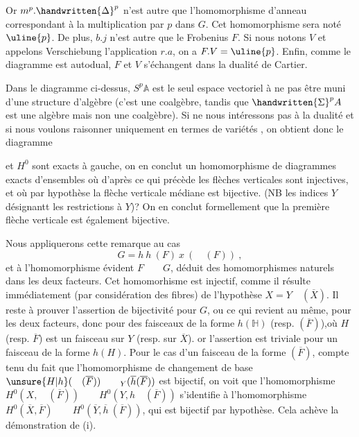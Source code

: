 Or $m^p.\handwritten{\Delta}^{p}$ n'est autre que l'homomorphisme d'anneau correspondant à la multiplication par $p$ dans $G$. Cet homomorphisme sera noté $\uline{p}$. De plus, $b.j$ n'est autre que le Frobenius $F$. Si nous notons $V$ et appelons Verschiebung l'application $r.a$, on a $F.V=\uline{p}$. Enfin, comme le diagramme est autodual, $F$ et $V$ s'échangent dans la dualité de Cartier.

Dans le diagramme ci-dessus, $S^p\mathbb{A}$ est le seul espace vectoriel à ne pas être muni d'une structure d'algèbre (c'est une coalgèbre, tandis que $\handwritten{\Sigma}^{p}A$ est une algèbre mais non une coalgèbre). Si  ne nous intéressons pas à la dualité et si nous voulons raisonner uniquement en termes de variétés , on obtient donc le diagramme

et $H^0$ sont exacts à gauche, on en conclut un homomorphisme de diagrammes exacts d'ensembles
où d'après ce qui précède les flèches verticales sont injectives, et où par hypothèse la flèche verticale médiane est bijective. (NB les indices $Y$ désignantt les restrictions à $Y$)? On en conclut formellement que la première flèche verticale est également bijective.

Nous appliquerons cette remarque au cas 
\[
G=h\ h\ (F)\ x\ (\quad(F))\ ,
\]
et à l'homomorphisme évident $F\qquad G$, déduit des homomorphismes naturels dans les deux facteurs. Cet homomorhisme est injectif, comme il résulte immédiatement (par considération des fibres) de l'hypothèse $X=Y\quad(\overline{X})$. Il reste à prouver l'assertion de bijectivité pour $G$, ou ce qui revient au même, pour les deux facteurs, donc pour des faisceaux de la forme $h(\mathbb{H})$ (resp. $(\overline{F})$),où $H$ (resp. $\overline{F}$) est un faisceau sur $Y$ (resp. sur $\overline{X}$). or l'assertion est triviale pour un faisceau de la forme $h(H)$. Pour le cas d'un faisceau de la forme $(\overline{F})$, compte tenu du fait que l'homomorphisme de changement de base $\unsure{H|h}(\quad(\overline{F}))\qquad{}_{Y}(\overline{h}(\overline{F}))$ est bijectif, on voit que l'homomorphisme $H^0(X,\quad(\overline{F}))\qquad H^0(Y,h\quad(\overline{F}))$ s'identifie à l'homomorphisme $H^0(\overline{X},\overline{F})\qquad H^0(\overline{Y},\overline{h}\ (\overline{F}))$, qui est bijectif par hypothèse. Cela achève la démonstration de (i).

